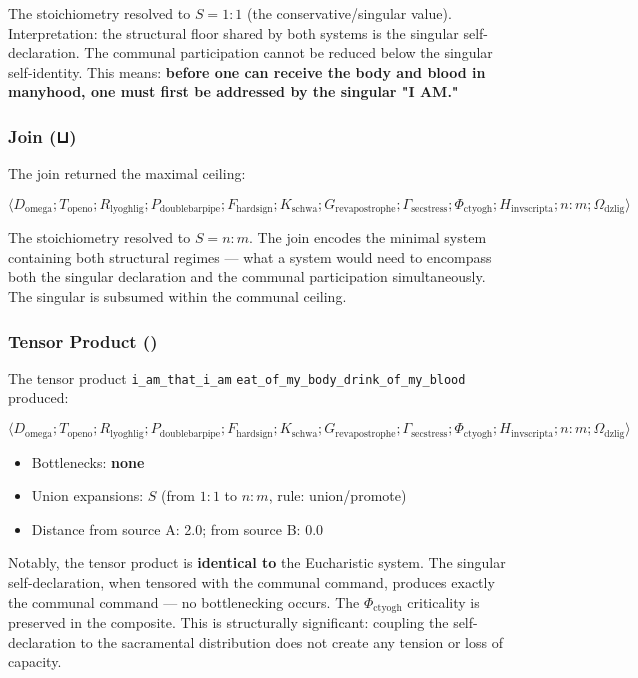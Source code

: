 \documentclass[12pt,a4paper]{article}
\begin{document}
The stoichiometry resolved to $S = 1{:}1$ (the conservative/singular value). Interpretation: the structural floor shared by both systems is the singular self-declaration. The communal participation cannot be reduced below the singular self-identity. This means: \textbf{before one can receive the body and blood in manyhood, one must first be addressed by the singular "I AM."}

\subsubsection{Join (⊔)}

The join returned the maximal ceiling:

\[\langle D_{\text{omega}}; T_{\text{openo}}; R_{\text{lyoghlig}}; P_{\text{doublebarpipe}}; F_{\text{hardsign}}; K_{\text{schwa}}; G_{\text{revapostrophe}}; \Gamma_{\text{secstress}}; \Phi_{\text{ctyogh}}; H_{\text{invscripta}}; n{:}m; \Omega_{\text{dzlig}} \rangle\]

The stoichiometry resolved to $S = n{:}m$. The join encodes the minimal system containing both structural regimes --- what a system would need to encompass both the singular declaration and the communal participation simultaneously. The singular is subsumed within the communal ceiling.

\subsubsection{Tensor Product (\otimes)}

The tensor product \texttt{i\_am\_that\_i\_am} \otimes \texttt{eat\_of\_my\_body\_drink\_of\_my\_blood} produced:

\[\langle D_{\text{omega}}; T_{\text{openo}}; R_{\text{lyoghlig}}; P_{\text{doublebarpipe}}; F_{\text{hardsign}}; K_{\text{schwa}}; G_{\text{revapostrophe}}; \Gamma_{\text{secstress}}; \Phi_{\text{ctyogh}}; H_{\text{invscripta}}; n{:}m; \Omega_{\text{dzlig}} \rangle\]

\begin{itemize}
    \item Bottlenecks: \textbf{none}
    \item Union expansions: $S$ (from $1{:}1$ to $n{:}m$, rule: union/promote)
    \item Distance from source A: 2.0; from source B: 0.0
\end{itemize}

Notably, the tensor product is \textbf{identical to} the Eucharistic system. The singular self-declaration, when tensored with the communal command, produces exactly the communal command --- no bottlenecking occurs. The $\Phi_{\text{ctyogh}}$ criticality is preserved in the composite. This is structurally significant: coupling the self-declaration to the sacramental distribution does not create any tension or loss of capacity.
\end{document}
